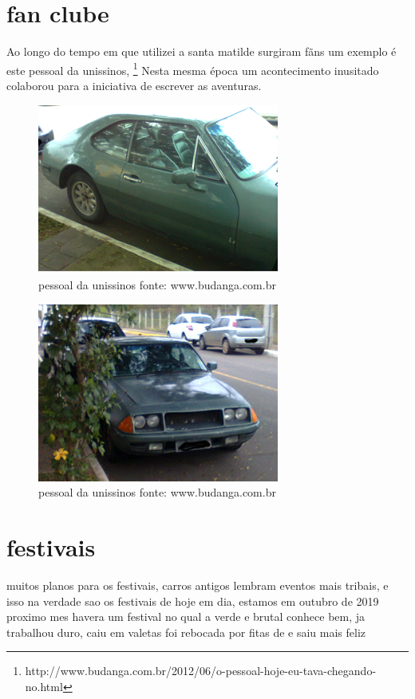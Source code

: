 \documentclass[a4paper]{report}
\begin{document}
\section*{fan clube}

Ao longo do tempo em que utilizei a santa matilde surgiram f\~ans um exemplo \'e este pessoal da unissinos, \footnote{http://www.budanga.com.br/2012/06/o-pessoal-hoje-eu-tava-chegando-no.html} 
Nesta mesma \'epoca um acontecimento inusitado colaborou para a iniciativa de escrever as aventuras.

\begin{figure}[!htb]
\centering
\includegraphics{Foto0296}
\caption{pessoal da unissinos fonte: www.budanga.com.br}
\label{fan clube SL }
\end{figure}


\begin{figure}[!htb]
\centering
\includegraphics{Foto0295}
\caption{pessoal da unissinos fonte: www.budanga.com.br}
\label{Blog do pessoal da Tecnosinos }
\end{figure}
\clearpage



\section*{festivais}
	muitos planos para os festivais, carros antigos lembram eventos mais tribais, e isso na verdade sao os festivais de hoje em dia, 
        estamos em outubro de 2019 proximo mes havera um festival no qual a verde e brutal conhece bem, ja trabalhou duro, caiu em valetas
        foi rebocada por fitas de e saiu mais feliz 
\end{document}
